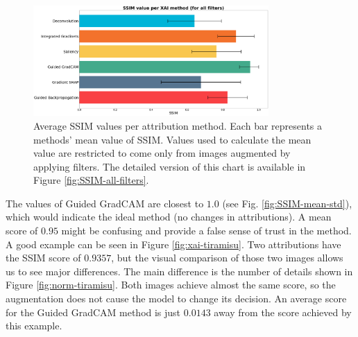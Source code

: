 \begin{figure}[ht]
  \centering
  \includegraphics[width=0.8\textwidth]{results/augment-img/filters-all.png}
  \caption{Average SSIM values per attribution method. Each bar represents a methods' mean value of SSIM. Values used to calculate the mean value are restricted to come only from images augmented by applying filters. The detailed version of this chart is available in Figure \ref{fig:SSIM-all-filters}.}\label{fig:SSIM-mean-filters}
\end{figure}

The values of Guided GradCAM are closest to $1.0$ (see Fig. \ref{fig:SSIM-mean-std}), which would indicate the ideal method (no changes in attributions). A mean score of $0.95$ might be confusing and provide a false sense of trust in the method. A good example can be seen in Figure \ref{fig:xai-tiramisu}. Two attributions have the SSIM score of $0.9357$, but the visual comparison of those two images allows us to see major differences. The main difference is the number of details shown in Figure \ref{fig:norm-tiramisu}. Both images achieve almost the same score, so the augmentation does not cause the model to change its decision. An average score for the Guided GradCAM method is just $0.0143$ away from the score achieved by this example.

